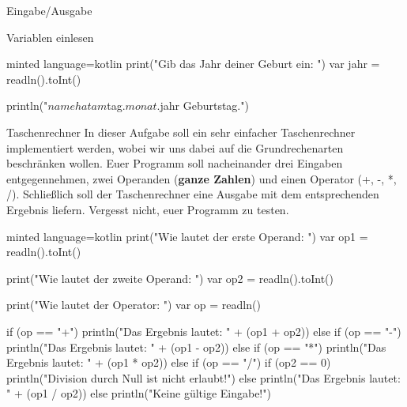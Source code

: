 \begin{task}[points=auto]{Eingabe/Ausgabe }
\begin{subtask*}[points=0]{Variablen einlesen}
\begin{solution}
\begin{codeBlock}[]{minted language=kotlin}
                print("Gib das Jahr deiner Geburt ein: ")
                var jahr = readln().toInt()

                println("$name hat am $tag.$monat.$jahr Geburtstag.")
            \end{codeBlock}
        \end{solution}
    \end{subtask*}
    \begin{subtask*}[points=0]{Taschenrechner}
        In dieser Aufgabe soll ein sehr einfacher Taschenrechner implementiert werden, wobei wir uns dabei auf die Grundrechenarten beschränken wollen. Euer Programm soll nacheinander drei Eingaben entgegennehmen, zwei Operanden (\textbf{ganze Zahlen}) und einen Operator ({\ttfamily +, -, *, /}). Schließlich soll der Taschenrechner eine Ausgabe mit dem entsprechenden Ergebnis liefern. Vergesst nicht, euer Programm zu testen.

        \begin{solution}
            \begin{codeBlock}[]{minted language=kotlin}
                print("Wie lautet der erste Operand: ")
                var op1 = readln().toInt()

                print("Wie lautet der zweite Operand: ")
                var op2 = readln().toInt()

                print("Wie lautet der Operator: ")
                var op = readln()

                if (op == "+") {
                    println("Das Ergebnis lautet: " + (op1 + op2))
                } else if (op == "-") {
                    println("Das Ergebnis lautet: " + (op1 - op2))
                } else if (op == "*") {
                    println("Das Ergebnis lautet: " + (op1 * op2))
                } else if (op == "/") {
                    if (op2 == 0) {
                        println("Division durch Null ist nicht erlaubt!")
                    } else {
                        println("Das Ergebnis lautet: " + (op1 / op2))
                    }
                } else {
                    println("Keine gültige Eingabe!")
                }
            \end{codeBlock}
        \end{solution}
    \end{subtask*}
\end{task}

